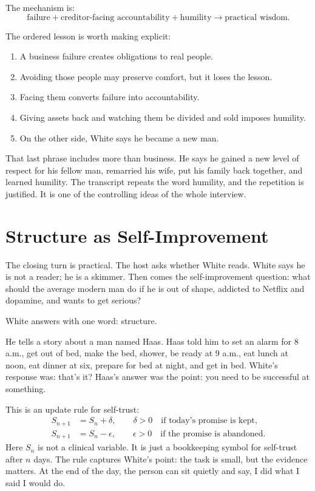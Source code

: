 The mechanism is:
\begin{equation}
\text{failure}
+
\text{creditor-facing accountability}
+
\text{humility}
\longrightarrow
\text{practical wisdom}.
\end{equation}

The ordered lesson is worth making explicit:
\begin{enumerate}
\item A business failure creates obligations to real people.
\item Avoiding those people may preserve comfort, but it loses the lesson.
\item Facing them converts failure into accountability.
\item Giving assets back and watching them be divided and sold imposes humility.
\item On the other side, White says he became a new man.
\end{enumerate}

That last phrase includes more than business. He says he gained a new level of respect for his fellow man, remarried his wife, put his family back together, and learned humility. The transcript repeats the word humility, and the repetition is justified. It is one of the controlling ideas of the whole interview.

\section{Structure as Self-Improvement}

The closing turn is practical. The host asks whether White reads. White says he is not a reader; he is a skimmer. Then comes the self-improvement question: what should the average modern man do if he is out of shape, addicted to Netflix and dopamine, and wants to get serious?

White answers with one word: structure.

He tells a story about a man named Haas. Haas told him to set an alarm for 8 a.m., get out of bed, make the bed, shower, be ready at 9 a.m., eat lunch at noon, eat dinner at six, prepare for bed at night, and get in bed. White's response was: that's it? Haas's answer was the point: you need to be successful at something.

This is an update rule for self-trust:
\begin{align}
S_{n+1} &= S_n + \delta, \qquad \delta > 0
        \quad \text{if today's promise is kept},\\
S_{n+1} &= S_n - \epsilon, \qquad \epsilon > 0
        \quad \text{if the promise is abandoned}.
\end{align}
Here \(S_n\) is not a clinical variable. It is just a bookkeeping symbol for self-trust after \(n\) days. The rule captures White's point: the task is small, but the evidence matters. At the end of the day, the person can sit quietly and say, I did what I said I would do.

